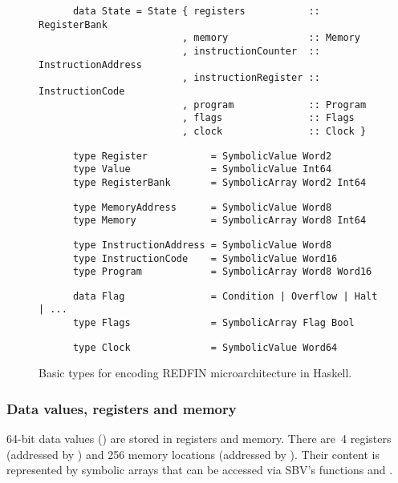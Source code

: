 \begin{figure}[t]

\begin{verbatim}
      data State = State { registers           :: RegisterBank
                         , memory              :: Memory
                         , instructionCounter  :: InstructionAddress
                         , instructionRegister :: InstructionCode
                         , program             :: Program
                         , flags               :: Flags
                         , clock               :: Clock }
\end{verbatim}

\begin{verbatim}
      type Register           = SymbolicValue Word2
      type Value              = SymbolicValue Int64
      type RegisterBank       = SymbolicArray Word2 Int64
\end{verbatim}

\begin{verbatim}
      type MemoryAddress      = SymbolicValue Word8
      type Memory             = SymbolicArray Word8 Int64
\end{verbatim}

\begin{verbatim}
      type InstructionAddress = SymbolicValue Word8
      type InstructionCode    = SymbolicValue Word16
      type Program            = SymbolicArray Word8 Word16
\end{verbatim}

\begin{verbatim}
      data Flag               = Condition | Overflow | Halt | ...
      type Flags              = SymbolicArray Flag Bool
\end{verbatim}

\begin{verbatim}
      type Clock              = SymbolicValue Word64
\end{verbatim}

\caption{Basic types for encoding REDFIN microarchitecture in Haskell.\label{fig-types}}

\end{figure}


\subsubsection{Data values, registers and memory}
64-bit data values () are stored in registers and memory. There are~4
registers (addressed by ) and 256 memory locations (addressed by
). Their content is represented by symbolic arrays that can be
accessed via SBV's functions  and .


